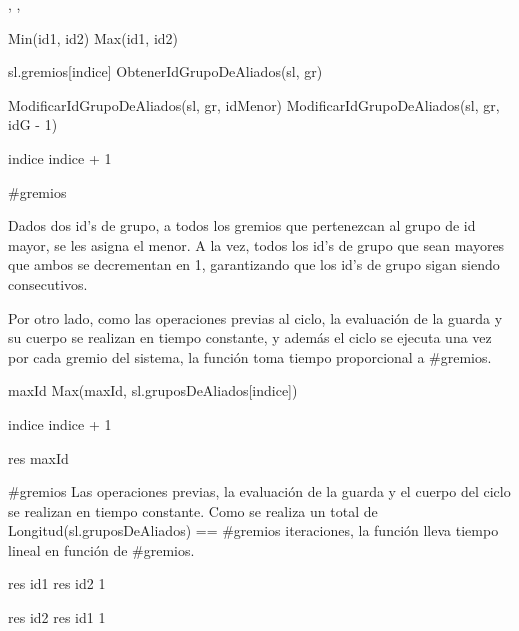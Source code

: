 {, , }{}
{
	\state {} \asig Min(id1, id2)						
	\state {} \asig Max(id1, id2)						
	\state

	\state {} 										

									
		\state

		\state {} \asig sl.gremios[indice]					
		\state {} \asig ObtenerIdGrupoDeAliados(sl, gr)		
		\state

														
			\state ModificarIdGrupoDeAliados(sl, gr, idMenor)					
		\Else {}										
				\state ModificarIdGrupoDeAliados(sl, gr, idG - 1)				
			\endif
		\endif
		\state

		\state indice \asig indice + 1										
	\endwhile
}
{\#gremios}
{ Dados dos id's de grupo, a todos los gremios que pertenezcan al grupo de id mayor, se les asigna el menor. A la vez, todos los id's de grupo que sean mayores que ambos se decrementan en 1, garantizando que los id's de grupo sigan siendo consecutivos.

\hspace{10pt} Por otro lado, como las operaciones previas al ciclo, la evaluación de la guarda y su cuerpo se realizan en tiempo constante, y además el ciclo se ejecuta una vez por cada gremio del sistema, la función toma tiempo proporcional a \#gremios. }

{
	\state {} 									

	\state
	\state {} 								
					
		\state
		
		\state maxId \asig Max(maxId, sl.gruposDeAliados[indice])	

		\state
		\state indice \asig indice + 1								
	\endwhile
	\state

	\state res \asig maxId											
}
{ \#gremios }
{ Las operaciones previas, la evaluación de la guarda y el cuerpo del ciclo se realizan en tiempo constante. Como se realiza un total de Longitud(sl.gruposDeAliados) == \#gremios iteraciones, la función lleva tiempo lineal en función de \#gremios. }

{
						
		\state res \asig id1			
	\Else
		\state res \asig id2			
	\endif
}
{1}
{}

{
						
		\state res \asig id2			
	\Else
		\state res \asig id1			
	\endif
}
{1}
{}